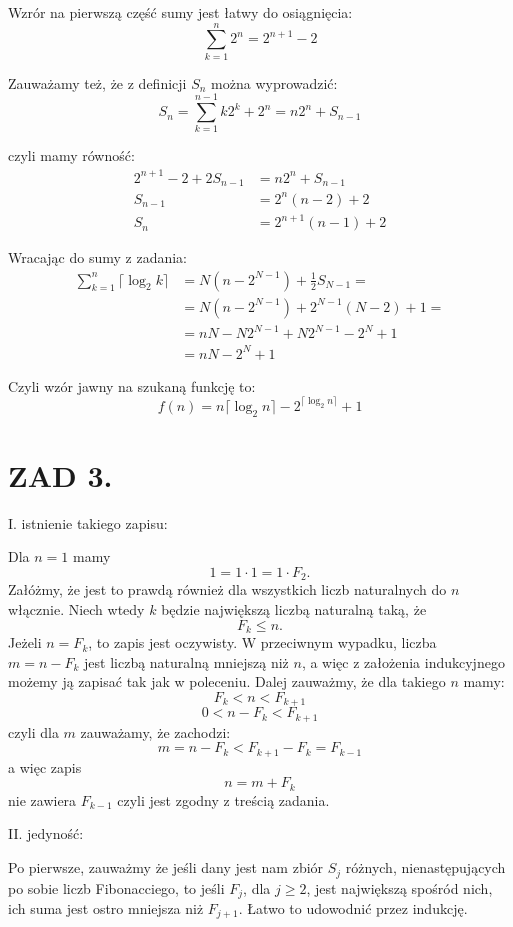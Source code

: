 \documentclass{article}[13pt]
\begin{document}
    Wzrór na pierwszą część sumy jest łatwy do osiągnięcia:
    $$\sum\limits_{k=1}^n2^n=2^{n+1}-2$$

    Zauważamy też, że z definicji $S_n$ można wyprowadzić:
    $$S_n=\sum\limits_{k=1}^{n-1}k2^k+2^n=n2^n+S_{n-1}$$

    czyli mamy równość:
    \begin{align*}
        2^{n+1}-2+2S_{n-1}&=n2^n+S_{n-1}\\
        S_{n-1}&=2^n(n-2)+2\\
        S_n&=2^{n+1}(n-1)+2
    \end{align*}

    Wracając do sumy z zadania:
    \begin{align*}
        \sum\limits_{k=1}^n\lceil\log_2k\rceil&=N(n-2^{N-1})+\frac12S_{N-1}=\\
        &=N(n-2^{N-1})+2^{N-1}(N-2)+1=\\
        &=nN-N2^{N-1}+N2^{N-1}-2^N+1\\
        &=nN-2^N+1
    \end{align*}

    Czyli wzór jawny na szukaną funkcję to:
    $$f(n)=n\lceil\log_2n\rceil-2^{\lceil\log_2n\rceil}+1$$

    \section*{ZAD 3.}

    I. istnienie takiego zapisu: 
    \medskip

    Dla $n=1$ mamy
    $$1=1\cdot 1=1\cdot F_2.$$
    Załóżmy, że jest to prawdą również dla wszystkich liczb naturalnych do $n$ włącznie. Niech wtedy $k$ będzie największą liczbą naturalną taką, że
    $$F_k\leq n.$$
    Jeżeli $n=F_k$, to zapis jest oczywisty. W przeciwnym wypadku, liczba $m=n-F_k$ jest liczbą naturalną mniejszą niż $n$, a więc z założenia indukcyjnego możemy ją zapisać tak jak w poleceniu. Dalej zauważmy, że dla takiego $n$ mamy:
    $$F_k< n<F_{k+1}$$
    $$0< n-F_k< F_{k+1}$$
    czyli dla $m$ zauważamy, że zachodzi:
    $$m=n-F_k<F_{k+1}-F_k=F_{k-1}$$
    a więc zapis
    $$n=m+F_k$$
    nie zawiera $F_{k-1}$ czyli jest zgodny z treścią zadania.
    \bigskip

    II. jedyność:
    \medskip

    Po pierwsze, zauważmy że jeśli dany jest nam zbiór $S_j$ różnych, nienastępujących po sobie liczb Fibonacciego, to jeśli $F_j$, dla $j\geq 2$, jest największą spośród nich, ich suma jest ostro mniejsza niż $F_{j+1}$. Łatwo to udowodnić przez indukcję.
    \smallskip
    
\end{document}
